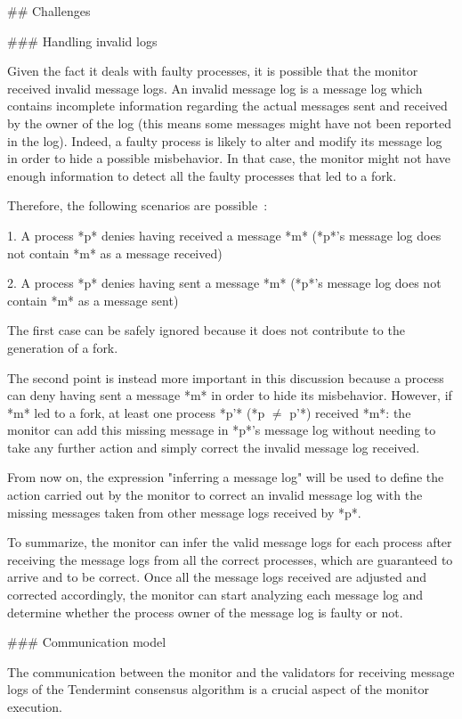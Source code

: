 \documentclass[a4paper,11pt,oneside]{report}
\begin{document}
\begin{markdown}
## Challenges

### Handling invalid logs

Given the fact it deals with faulty processes, it is possible that the monitor received invalid message logs. An invalid message log is a message log which contains incomplete information regarding the actual messages sent and received by the owner of the log (this means some messages might have not been reported in the log).
Indeed, a faulty process is likely to alter and modify its message log in order to hide a possible misbehavior. In that case, the monitor might not have enough information to detect all the faulty processes that led to a fork. 

Therefore, the following scenarios are possible~\cite{fork-accountability-specs}:
 
1. A process *p* denies having received a message *m* (*p*'s message log does not contain *m* as a message received)  

2. A process *p* denies having sent a message *m* (*p*'s message log does not contain *m* as a message sent) 

The first case can be safely ignored because it does not contribute to the generation of a fork.

The second point is instead more important in this discussion because a process can deny having sent a message *m* in order to hide its misbehavior. 
However, if *m* led to a fork, at least one process *p'* (*p $\neq$ p'*) received *m*: the monitor can add this missing message in *p*'s message log without needing to take any further action and simply correct the invalid message log received. 

From now on, the expression "inferring a message log" will be used to define the action carried out by the monitor to correct an invalid message log with the missing messages taken from other message logs received by *p*.

To summarize, the monitor can infer the valid message logs for each process after receiving the message logs from all the correct processes, which are guaranteed to arrive and to be correct.
Once all the message logs received are adjusted and corrected accordingly, the monitor can start analyzing each message log and determine whether the process owner of the message log is faulty or not.

### Communication model

The communication between the monitor and the validators for receiving message logs of the Tendermint consensus algorithm is a crucial aspect of the monitor execution.


\end{markdown}
\end{document}
